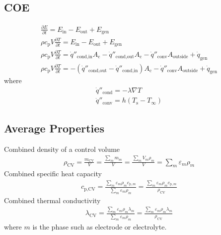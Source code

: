 \documentclass[12pt]{article}
\begin{document}
	\subsection{COE}
		\begin{gather}
			\frac{\partial E }{\partial t } = E_\text{in} - E_\text{out} + E_\text{gen} \\
			\rho c_\text{p} V \frac{\partial T}{\partial t} = E_\text{in} - E_\text{out} + E_\text{gen} \\
			\rho c_\text{p} V \frac{\partial T}{\partial t} = \dot{q}''_\text{cond,in} A_\text{c} - \dot{q}''_\text{cond,out} A_\text{c} - \dot{q}''_\text{conv} A_\text{outside} + \dot{q}_\text{gen} \\
			\rho c_\text{p} V \frac{\partial T}{\partial t} = - \left( \dot{q}''_\text{cond,out} - \dot{q}''_\text{cond,in} \right)  A_\text{c} - \dot{q}''_\text{conv} A_\text{outside} + \dot{q}_\text{gen} 
			\label{eqn:COE_Balance}
		\end{gather}
		where
		\begin{gather}
			\dot{q}''_\text{cond} = -\lambda \nabla T \\
			\dot{q}''_\text{conv} = h \left( T_\text{s} - T_\infty \right)
		\end{gather}
		
		\subsection{Average Properties}
			Combined density of a control volume
			\begin{gather}
				\rho_\text{CV} = \frac{ m_\text{CV} }{ V } = \frac{\sum_m m_m }{ V } = \frac{ \sum_m V_m \rho_m }{ V } = \sum_m \varepsilon_m \rho_m 
			\end{gather}
			Combined specific heat capacity
			\begin{gather}
				c_\text{p,CV} = \frac{ \sum_m \varepsilon_m \rho_m c_{\text{p},m} }{ \sum_m \varepsilon_m \rho_m }
				              = \frac{ \sum_m \varepsilon_m \rho_m c_{\text{p},m} }{ \rho_\text{CV} }
			\end{gather}
			Combined thermal conductivity
			\begin{gather}
			\lambda_\text{CV} = \frac{ \sum_m \varepsilon_m \rho_m \lambda_m }{ \sum_m \varepsilon_m \rho_m }
							  = \frac{ \sum_m \varepsilon_m \rho_m \lambda_m }{ \rho_\text{CV} }
			\end{gather}
			where $m$ is the phase such as electrode or electrolyte.
		
\end{document}
